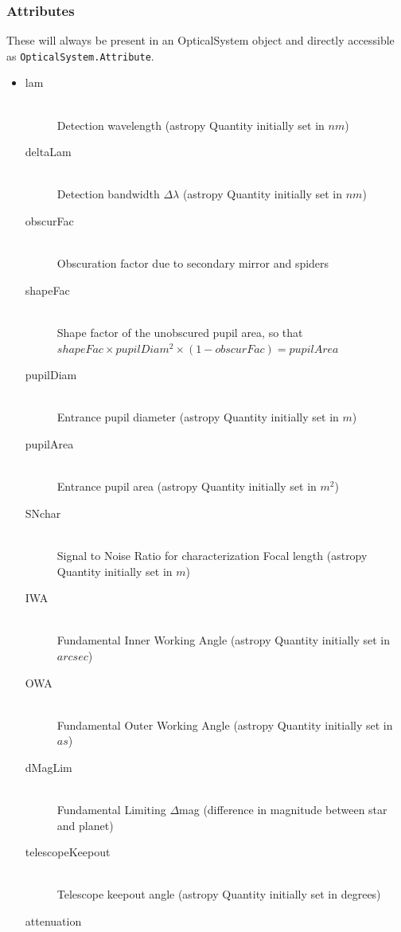 \documentclass[cleanfoot]{asme2ej}
\begin{document}
\subsubsection*{Attributes}
These will always be present in an OpticalSystem object and directly accessible as \verb+OpticalSystem.Attribute+.
\begin{itemize}
\item 
\begin{description}
    \item[lam] \hfill \\
    Detection wavelength (astropy Quantity initially set in $ nm $)
    \item[deltaLam] \hfill \\
    Detection bandwidth $ \Delta\lambda $ (astropy Quantity initially set in $ nm $)
    \item[obscurFac] \hfill \\
    Obscuration factor due to secondary mirror and spiders
    \item[shapeFac] \hfill \\
    Shape factor of the unobscured pupil area, so that $ shapeFac \times pupilDiam^2  \times (1-obscurFac) = pupilArea $
    \item[pupilDiam] \hfill \\
    Entrance pupil diameter (astropy Quantity initially set in $ m $)
    \item[pupilArea] \hfill \\
    Entrance pupil area (astropy Quantity initially set in $ m^{2} $)
    \item[SNchar] \hfill \\
    Signal to Noise Ratio for characterization
    Focal length (astropy Quantity initially set in $ m $)
    \item[IWA] \hfill \\
    Fundamental Inner Working Angle (astropy Quantity initially set in $ arcsec $)
    \item[OWA] \hfill \\
    Fundamental Outer Working Angle (astropy Quantity initially set in $ as $)
    \item[dMagLim] \hfill \\
    Fundamental Limiting $ \Delta$mag (difference in magnitude between star and planet)
    \item[telescopeKeepout] \hfill \\
    Telescope keepout angle (astropy Quantity initially set in degrees)
    \item[attenuation] \hfill \\

\end{description}
\end{itemize}
\end{document}
